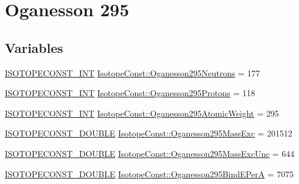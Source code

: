 \hypertarget{group___isotope_const-_oganesson-_og295}{}\section{Oganesson 295}
\label{group___isotope_const-_oganesson-_og295}
\subsection*{Variables}
\begin{DoxyCompactItemize}
\item 
\mbox{\hyperlink{group___isotope_const-_macros_ga5f18360b3e99483a35c32d789e62621c}{I\+S\+O\+T\+O\+P\+E\+C\+O\+N\+S\+T\+\_\+\+I\+NT}} \mbox{\hyperlink{group___isotope_const-_oganesson-_og295_gaffc340c75152cc09dad82a6767180c09}{Isotope\+Const\+::\+Oganesson295\+Neutrons}} = 177
\item 
\mbox{\hyperlink{group___isotope_const-_macros_ga5f18360b3e99483a35c32d789e62621c}{I\+S\+O\+T\+O\+P\+E\+C\+O\+N\+S\+T\+\_\+\+I\+NT}} \mbox{\hyperlink{group___isotope_const-_oganesson-_og295_gad6097bd0fda633d094f8538c3295d647}{Isotope\+Const\+::\+Oganesson295\+Protons}} = 118
\item 
\mbox{\hyperlink{group___isotope_const-_macros_ga5f18360b3e99483a35c32d789e62621c}{I\+S\+O\+T\+O\+P\+E\+C\+O\+N\+S\+T\+\_\+\+I\+NT}} \mbox{\hyperlink{group___isotope_const-_oganesson-_og295_gaff640e2ac6908b93c6027270a3dd06ed}{Isotope\+Const\+::\+Oganesson295\+Atomic\+Weight}} = 295
\item 
\mbox{\hyperlink{group___isotope_const-_macros_ga8f45a7272ce02c0b4c65c44636ed719a}{I\+S\+O\+T\+O\+P\+E\+C\+O\+N\+S\+T\+\_\+\+D\+O\+U\+B\+LE}} \mbox{\hyperlink{group___isotope_const-_oganesson-_og295_gab1da341344b4c72cac7b1ed10b530f26}{Isotope\+Const\+::\+Oganesson295\+Mass\+Exc}} = 201512
\item 
\mbox{\hyperlink{group___isotope_const-_macros_ga8f45a7272ce02c0b4c65c44636ed719a}{I\+S\+O\+T\+O\+P\+E\+C\+O\+N\+S\+T\+\_\+\+D\+O\+U\+B\+LE}} \mbox{\hyperlink{group___isotope_const-_oganesson-_og295_gac36d8afe03e3ad52778392153a12769e}{Isotope\+Const\+::\+Oganesson295\+Mass\+Exc\+Unc}} = 644
\item 
\mbox{\hyperlink{group___isotope_const-_macros_ga8f45a7272ce02c0b4c65c44636ed719a}{I\+S\+O\+T\+O\+P\+E\+C\+O\+N\+S\+T\+\_\+\+D\+O\+U\+B\+LE}} \mbox{\hyperlink{group___isotope_const-_oganesson-_og295_gab8db62c2e566cfba6dc61cc47d217690}{Isotope\+Const\+::\+Oganesson295\+Bind\+E\+PerA}} = 7075
\item 

\end{DoxyCompactItemize}
